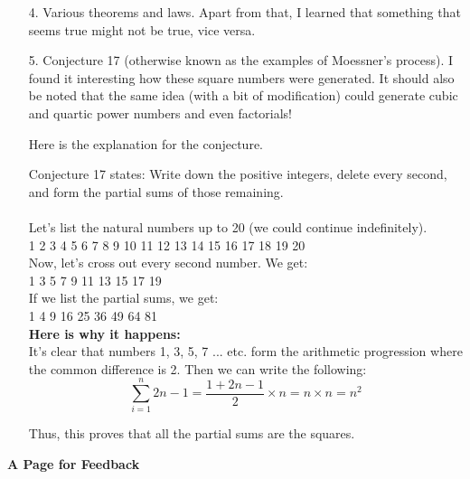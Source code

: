 \documentclass[12pt, a4paper]{article}             %
\begin{document}
\begin{enumerate}
\item[4.]
Various theorems and laws. Apart from that, I learned that something that seems true might not be true, vice versa.

\item[5.]
Conjecture 17 (otherwise known as the examples of Moessner's process). 
I found it interesting how these square numbers were generated. It
should also be noted that the same idea (with a bit of modification)
could generate cubic and quartic power numbers and even factorials!

Here is the explanation for the conjecture.

Conjecture 17 states: Write down the positive integers, delete every second, and form the
partial sums of those remaining.\\\\
Let's list the natural numbers up to 20 (we could continue indefinitely).\\

1 2 3 4 5 6 7 8 9 10 11 12 13 14 15 16 17 18 19 20\\

Now, let's cross out every second number.
We get:\\

1  3  5  7  9  11  13  15  17  19 \\

If we list the partial sums, we get:\\

1 4 9 16 25 36 49 64 81\\

\textbf{Here is why it happens:}\\

It's clear that numbers 1, 3, 5, 7 ... etc. form the arithmetic progression where the common difference is 2.
Then we can write the following:\\
$$\sum_{i=1}^n 2n-1 = \dfrac{1 + 2n - 1}{2} \times n = n \times n = n^2$$

Thus, this proves that all the partial sums are the squares.
\end{enumerate}

\newpage
\begin{center}
\LARGE{\textbf{A Page for Feedback}}
\end{center}
\end{document}
